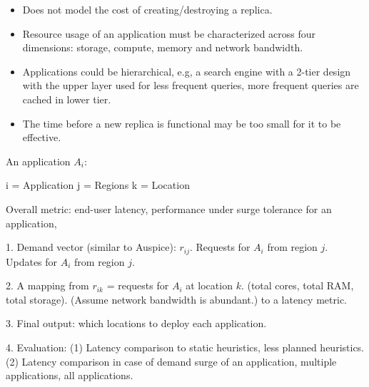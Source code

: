 \begin{itemize}
\item
Does not model the cost of creating/destroying a replica.
\item
Resource usage of an application must be characterized across four dimensions: storage, compute, memory and network bandwidth.
\item
Applications could be hierarchical, e.g, a search engine with a 2-tier design with the upper layer used for less frequent queries, more frequent queries are cached in lower tier.
\item
The time before a new replica is functional may be too small for it to be effective. 
\end{itemize}


An application $A_i$: 

i = Application
j = Regions
k = Location

Overall metric: end-user latency, performance under surge tolerance for an application, 

1. Demand vector (similar to Auspice): $r_{ij}$. Requests for $A_i$ from region $j$. Updates for $A_i$ from region $j$.

2. A mapping from $r_{ik}$ = requests for $A_i$ at location $k$. (total cores, total RAM, total storage). (Assume network bandwidth is abundant.)  to a latency metric.

3. Final output: which locations to deploy each application.

4. Evaluation: (1) Latency comparison to static heuristics, less planned heuristics. (2) Latency comparison in case of demand surge of an application, multiple applications, all applications.
















